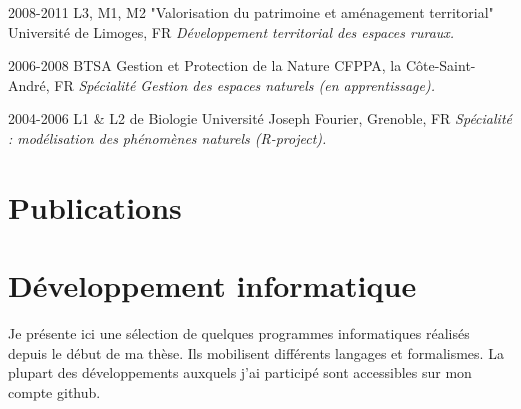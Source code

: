 \documentclass[]{cv-etienne}
\begin{document}
\begin{entrylist}
\entry
{2008-2011}
{L3, M1, M2 {\normalfont "Valorisation du patrimoine et aménagement territorial"}}
{ Université de Limoges, FR}
{\emph{Développement territorial des espaces ruraux.}}
\end{entrylist}

\begin{entrylist}
\entry
{2006-2008}
{BTSA {\normalfont Gestion et Protection de la Nature }}
{ CFPPA, la Côte-Saint-André, FR}
{\emph{Spécialité Gestion des espaces naturels (en apprentissage).}}
\end{entrylist}

\begin{entrylist}
\entry
{2004-2006}
{L1 \& L2 de Biologie}
{ Université Joseph Fourier, Grenoble, FR}
{\emph{Spécialité : modélisation des phénomènes naturels (R-project).}}
\end{entrylist}
\section{Publications}
\begin{refsection}
  \nocite{*}
  \printbibliography[type=article,title={Articles dans des revues à comité de lecture},heading=subbibliography]
  \nocite{*}
  \printbibliography[type=incollection,title={Chapitres de livre},heading=subbibliography]
  \nocite{*}
  \printbibliography[type=inproceedings,title={Conférences/posters},heading=subbibliography]
\end{refsection}
\section{Développement informatique}
Je présente ici une sélection de quelques programmes informatiques réalisés depuis le début de ma thèse. Ils mobilisent différents langages et formalismes. La plupart des développements auxquels j'ai participé sont accessibles sur mon compte github.
\end{document}

